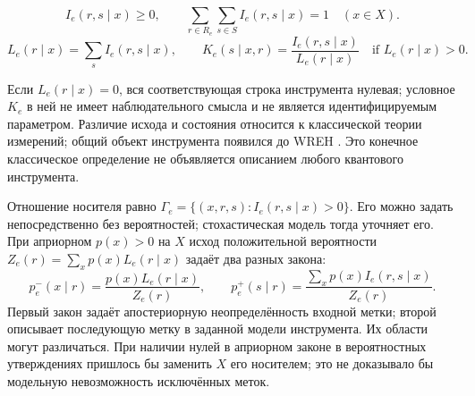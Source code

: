 \begin{definition}
\label{def:instrument}
\begin{equation}\label{eq:normalization}
 I_e(r,s\mid x)\geq0,\qquad
 \sum_{r\in R_e}\sum_{s\in S}I_e(r,s\mid x)=1\quad(x\in X).
\end{equation}
\begin{equation}\label{eq:factorization}
 L_e(r\mid x)=\sum_s I_e(r,s\mid x),\qquad
 K_e(s\mid x,r)=\frac{I_e(r,s\mid x)}{L_e(r\mid x)}\quad\text{if }L_e(r\mid x)>0.
\end{equation}
\end{definition}
{Если $L_e(r\mid x)=0$, вся соответствующая строка инструмента нулевая; условное $K_e$ в ней не имеет наблюдательного смысла и не является идентифицируемым параметром. Различие исхода и состояния относится к классической теории измерений; общий объект инструмента появился до WREH \cite{DaviesLewis}. Это конечное классическое определение не объявляется описанием любого квантового инструмента.}

{Отношение носителя равно $\Gamma_e=\{(x,r,s):I_e(r,s\mid x)>0\}$. Его можно задать непосредственно без вероятностей; стохастическая модель тогда уточняет его. При априорном $p(x)>0$ на $X$ исход положительной вероятности $Z_e(r)=\sum_xp(x)L_e(r\mid x)$ задаёт два разных закона:}
\begin{equation}\label{eq:posterior}
 p_e^-(x\mid r)=\frac{p(x)L_e(r\mid x)}{Z_e(r)},\qquad
 p_e^+(s\mid r)=\frac{\sum_x p(x)I_e(r,s\mid x)}{Z_e(r)}.
\end{equation}
{Первый закон задаёт апостериорную неопределённость входной метки; второй описывает последующую метку в заданной модели инструмента. Их области могут различаться. При наличии нулей в априорном законе в вероятностных утверждениях пришлось бы заменить $X$ его носителем; это не доказывало бы модельную невозможность исключённых меток.}

